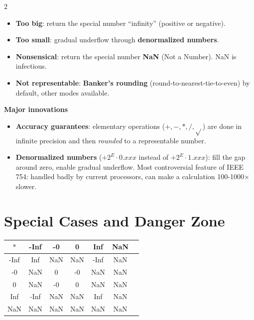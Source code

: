 \documentclass[a4paper,9pt]{extarticle}
\begin{document}
\begin{multicols}{2}
\begin{summary}
\begin{itemize}
\item \textbf{Too big}: return the special number ``infinity'' (positive or negative).

\item \textbf{Too small}: gradual underflow through \textbf{denormalized numbers}.

\item \textbf{Nonsensical}: return the special number \textbf{NaN} (Not a Number). NaN is
infectious.

\item \textbf{Not representable}: \textbf{Banker's rounding} (round-to-nearest-tie-to-even) by
default, other modes available.

\end{itemize}

\end{summary}


\begin{important}

\textbf{Major innovations}

\begin{itemize}

\item \textbf{Accuracy guarantees}: elementary operations ($+, -, *, /, \sqrt{}$) are done in
infinite precision and then \emph{rounded} to a representable number.

\item \textbf{Denormalized numbers} ($+2^E \cdot 0.xxx$ instead of $+2^E \cdot 1.xxx$): fill
the gap around zero, enable gradual underflow. Most controversial feature of IEEE 754: handled
badly by current processors, can make a calculation 100-1000$\times$ slower.

\end{itemize}

\end{important}



\section{Special Cases and Danger Zone}


\begin{center}
\small
\begin{tabular}{c|cccccc}
$*$ & -Inf & -0 & 0 & Inf & NaN \\
\hline
-Inf & Inf & NaN & NaN & -Inf & NaN \\
-0 & NaN & 0 & -0 & NaN & NaN \\
0 & NaN & -0 & 0 & NaN & NaN \\
Inf & -Inf & NaN & NaN & Inf & NaN \\
NaN & NaN & NaN & NaN & NaN & NaN \\
\end{tabular}
\end{center}



\end{multicols}
\end{document}
